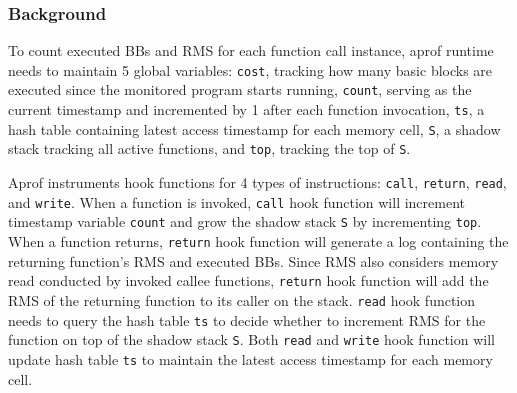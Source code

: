 \subsubsection{Background}
To count executed BBs and RMS for each function call instance,
aprof runtime needs to maintain 5 global variables:
\texttt{cost}, 
tracking how many basic blocks are executed since the monitored program starts running, 
\texttt{count}, 
serving as the current timestamp and incremented by 1 after each function invocation, 
\texttt{ts}, 
a hash table containing latest access timestamp for each memory cell,
\texttt{S}, 
a shadow stack tracking all active functions, 
and \texttt{top}, 
tracking the top of \texttt{S}.

Aprof instruments hook functions for 4 types of instructions: 
\texttt{call}, \texttt{return}, \texttt{read}, and \texttt{write}. 
When a function is invoked, 
\texttt{call} hook function will increment timestamp variable \texttt{count}
and grow the shadow stack \texttt{S} by incrementing \texttt{top}.
When a function returns,
\texttt{return} hook function will 
generate a log 
containing the returning function's RMS and executed BBs.
Since RMS also considers memory read conducted by 
invoked callee functions, 
\texttt{return} hook function will add 
the RMS of the returning function to its caller on the stack. 
\texttt{read} hook function needs to query the hash table \texttt{ts} to decide  
whether to increment RMS for the function on top of the shadow stack \texttt{S}.
Both \texttt{read} and \texttt{write} 
hook function will update hash table \texttt{ts}
to maintain the latest access timestamp for each memory cell. 





